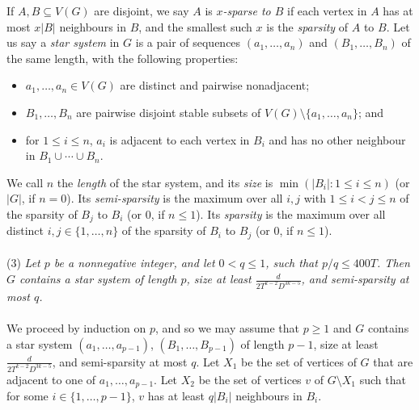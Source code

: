 \documentclass[titlepage,11pt]{article}
\def\LL{,\ldots,}
\newcommand{\cupcup}{\cup \cdots\cup}
\begin{document}
\bigskip

If $A,B\subseteq V(G)$ are disjoint, we say $A$ is {\em $x$-sparse to $B$} if each vertex in $A$ has at most $x|B|$ neighbours in $B$,
and the smallest such $x$ is the {\em sparsity} of $A$ to $B$.
Let us say a {\em star system} in $G$ is a pair of sequences $(a_1\LL a_n)$ and $(B_1\LL B_n)$ of the same length,
with the following properties:
\begin{itemize}
\item $a_1\LL a_n\in V(G)$ are distinct and pairwise nonadjacent;
\item $B_1\LL B_n$ are pairwise disjoint stable subsets of $V(G)\setminus \{a_1\LL a_n\}$; and
\item for $1\le i\le n$, $a_i$ is adjacent to each vertex in $B_i$ and has no other neighbour in $B_1\cupcup B_n$.
\end{itemize}
We call $n$ the {\em length} of the star system, and its {\em size} is $\min(|B_i|:1\le i\le n)$ (or $|G|$, if $n=0$). 
Its {\em semi-sparsity}
is the maximum over all $i,j$ with $1\le i<j\le n$
of the sparsity of $B_j$ to $B_i$
(or $0$, if $n\le 1$).
Its {\em sparsity} is the maximum over all distinct $i,j\in \{1\LL n\}$
of the sparsity of $B_i$ to $B_j$ (or $0$, if $n\le 1$).
\\
\\
(3) {\em Let $p$ be a nonnegative integer, and let $0<q\le 1$, such that $p/q\le 400T$. 
Then $G$ contains a star system of length $p$, 
size at least $\frac{d}{2T^{k-2}D^{3k-5}}$, and semi-sparsity at most $q$.}
\\
\\
We proceed by induction on $p$, 
and so we may assume that $p\ge 1$ and $G$ contains a star system $(a_1\LL a_{p-1})$,
$(B_1\LL B_{p-1})$ of length $p-1$,
size at least $\frac{d}{2T^{k-2}D^{3k-5}}$, and semi-sparsity at most  $q$.
Let $X_1$ be the set of vertices of $G$ that 
are adjacent to one of $a_1\LL a_{p-1}$. Let $X_2$ be the set of vertices $v$ of $G\setminus X_1$ such that
for some $i\in \{1\LL p-1\}$, $v$ has at least $q|B_i|$  neighbours in $B_i$.
\end{document}
